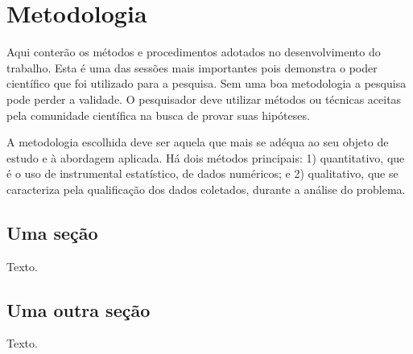 \chapter{Metodologia}

Aqui conterão os métodos e procedimentos adotados no desenvolvimento do
trabalho. Esta é uma das sessões mais importantes pois demonstra o poder
científico que foi utilizado para a pesquisa. Sem uma boa metodologia a
pesquisa pode perder a validade. O pesquisador deve utilizar métodos ou
técnicas aceitas pela comunidade científica na busca de provar suas hipóteses.

A metodologia escolhida deve ser aquela que mais se adéqua ao seu objeto de
estudo e à abordagem aplicada. Há dois métodos principais: 1) quantitativo, que
é o uso de instrumental estatístico, de dados numéricos; e 2) qualitativo, que
se caracteriza pela qualificação dos dados coletados, durante a análise do
problema.

\section{Uma seção}
Texto.

\section{Uma outra seção}
Texto.
